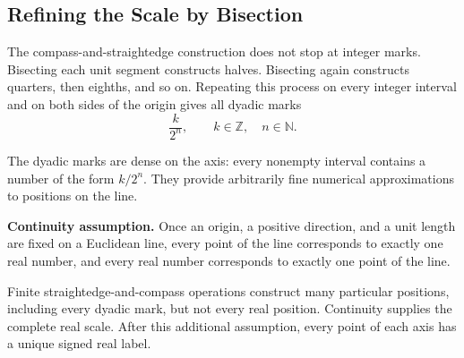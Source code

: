 \subsection{Refining the Scale by Bisection}

\begin{derivationbox}
The compass-and-straightedge construction does not stop at integer marks.
Bisecting each unit segment constructs halves. Bisecting again constructs
quarters, then eighths, and so on. Repeating this process on every integer
interval and on both sides of the origin gives all dyadic marks
\[
\boxed{\frac{k}{2^n}},
\qquad k\in\mathbb Z,
\quad n\in\mathbb N.
\]
\end{derivationbox}

\begin{center}
\end{center}

\begin{theorembox}
The dyadic marks are dense on the axis: every nonempty interval contains a
number of the form $k/2^n$. They provide arbitrarily fine numerical
approximations to positions on the line.
\end{theorembox}

\begin{definitionbox}
\textbf{Continuity assumption.} Once an origin, a positive direction, and a unit
length are fixed on a Euclidean line, every point of the line corresponds to
exactly one real number, and every real number corresponds to exactly one point
of the line.
\end{definitionbox}

\begin{interpretationbox}
Finite straightedge-and-compass operations construct many particular positions,
including every dyadic mark, but not every real position. Continuity supplies
the complete real scale. After this additional assumption, every point of each
axis has a unique signed real label.
\end{interpretationbox}
